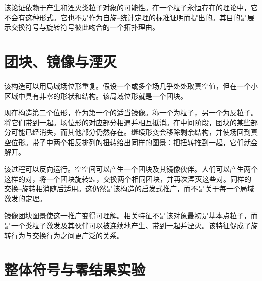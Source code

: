 \begin{classroomqa}
\end{classroomqa}

该论证依赖于产生和湮灭类粒子对象的可能性。在一个粒子永恒存在的理论中，它不会有这种形式。它也不是作为自旋--统计定理的标准证明而提出的。其目的是展示交换符号与旋转符号彼此吻合的一个拓扑理由。

\section{团块、镜像与湮灭}

该构造可以用局域场位形重复。假设一个或多个场几乎处处取真空值，但在一个小区域中具有非零的形状和结构。该局域位形就是一个团块。

现在构造第二个位形，作为第一个的适当镜像。称一个为粒子，另一个为反粒子。将它们带到一起。场位形的对应部分相遇并相互抵消。在中间阶段，团块的某些部分可能已经消失，而其他部分仍然存在。继续形变会移除剩余结构，并使场回到真空位形。带子中两个相反排列的扭转给出同样的图景：把扭转推到一起，它们就会解开。

该过程可以反向运行。空空间可以产生一个团块及其镜像伙伴。人们可以产生两个这样的对，将一个团块旋转\(2\pi\)，交换两个相同团块，并再次湮灭这些对。同样的交换--旋转相消随后适用。这仍然是该构造的启发式推广，而不是关于每一个局域激发的定理。

\begin{classroomqa}
\end{classroomqa}

镜像团块图景使这一推广变得可理解。相关特征不是该对象最初是基本点粒子，而是一个类粒子激发及其伙伴可以被连续地产生、带到一起并湮灭。该特征促成了旋转行为与交换行为之间更广泛的关系。

\begin{classroomqa}
\end{classroomqa}

\section{整体符号与零结果实验}

